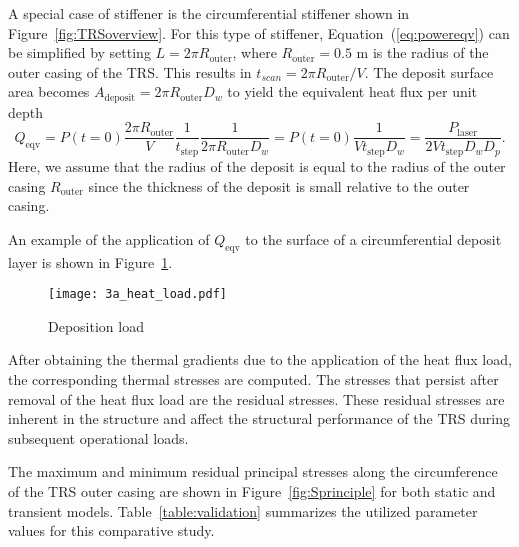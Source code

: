 A special case of stiffener is the circumferential stiffener shown in Figure~\ref{fig:TRSoverview}. For this type of stiffener, Equation~(\ref{eq:powereqv}) can be simplified by setting $L = 2\pi R_{\textrm{outer}}$, where $R_{\textrm{outer}} = 0.5$ m is the radius of the outer casing of the \ac{TRS}. This results in $t_{scan} = 2\pi R_{\textrm{outer}}/V$. The deposit surface area becomes $A_{\textrm{deposit}} = 2\pi {R_{\textrm{outer}}}D_w$ to yield the equivalent heat flux per unit depth
%
\begin{equation}
	\label{eq:powereqvcirc}
	Q_{\textrm{eqv}} = P(t=0)\dfrac{2\pi R_{\textrm{outer}}}{V}\dfrac{1}{t_{\textrm{step}}}\dfrac{1}{2\pi {R_{\textrm{outer}}}D_w} = P(t=0)\dfrac{1}{{V}t_{\textrm{step}}D_w} = \dfrac{P_{\textrm{laser}}}{{2V}t_{\textrm{step}}D_wD_p}.
\end{equation}
%
Here, we assume that the radius of the deposit is equal to the radius of the outer casing $R_{\textrm{outer}}$ since the thickness of the deposit is small relative to the outer casing.

An example of the application of $Q_{\textrm{eqv}}$ to the surface of a circumferential deposit layer is shown in Figure~\ref{fig:depload}.

\begin{figure}[h!]
    \centering
    \texttt{[image: 3a\_heat\_load.pdf]}
    \caption{ \label{fig:depload} Deposition load }
\end{figure}

After obtaining the thermal gradients due to the application of the heat flux load, the corresponding thermal stresses are computed. The stresses that persist after removal of the heat flux load are the residual stresses. These residual stresses are inherent in the structure and affect the structural performance of the \ac{TRS} during subsequent operational loads. 

The maximum and minimum residual principal stresses along the circumference of the \ac{TRS} outer casing are shown in Figure~\ref{fig:Sprinciple} for both static and transient models. Table~\ref{table:validation} summarizes the utilized parameter values for this comparative study.

